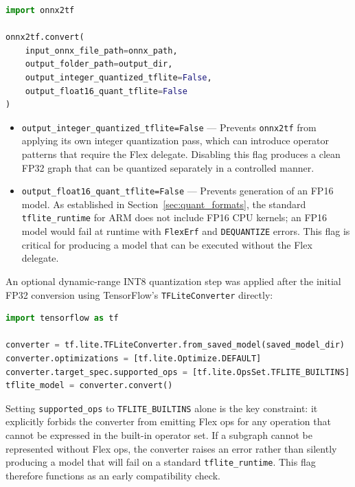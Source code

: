 \begin{lstlisting}[language=Python,
                   caption={ONNX to TFLite conversion using onnx2tf.},
                   label={lst:onnx2tf}]
import onnx2tf

onnx2tf.convert(
    input_onnx_file_path=onnx_path,
    output_folder_path=output_dir,
    output_integer_quantized_tflite=False,
    output_float16_quant_tflite=False
)
\end{lstlisting}

\begin{itemize}
    \item \texttt{output\_integer\_quantized\_tflite=False} — Prevents
          \texttt{onnx2tf} from applying its own integer quantization
          pass, which can introduce operator patterns that require the
          Flex delegate. Disabling this flag produces a clean FP32
          graph that can be quantized separately in a controlled
          manner.

    \item \texttt{output\_float16\_quant\_tflite=False} — Prevents
          generation of an FP16 model. As established in
          Section~\ref{sec:quant_formats}, the standard
          \texttt{tflite\_runtime} for ARM does not include FP16 CPU
          kernels; an FP16 model would fail at runtime with
          \texttt{FlexErf} and \texttt{DEQUANTIZE} errors. This flag
          is critical for producing a model that can be executed
          without the Flex delegate.
\end{itemize}

An optional dynamic-range INT8 quantization step was applied after
the initial FP32 conversion using TensorFlow's \texttt{TFLiteConverter}
directly:

\begin{lstlisting}[language=Python,
                   caption={Optional dynamic-range INT8 quantization
                            via TFLiteConverter.},
                   label={lst:int8_quant}]
import tensorflow as tf

converter = tf.lite.TFLiteConverter.from_saved_model(saved_model_dir)
converter.optimizations = [tf.lite.Optimize.DEFAULT]
converter.target_spec.supported_ops = [tf.lite.OpsSet.TFLITE_BUILTINS]
tflite_model = converter.convert()
\end{lstlisting}

Setting \texttt{supported\_ops} to \texttt{TFLITE\_BUILTINS} alone is
the key constraint: it explicitly forbids the converter from emitting
Flex ops for any operation that cannot be expressed in the built-in
operator set. If a subgraph cannot be represented without Flex ops,
the converter raises an error rather than silently producing a model
that will fail on a standard \texttt{tflite\_runtime}. This flag
therefore functions as an early compatibility check.

